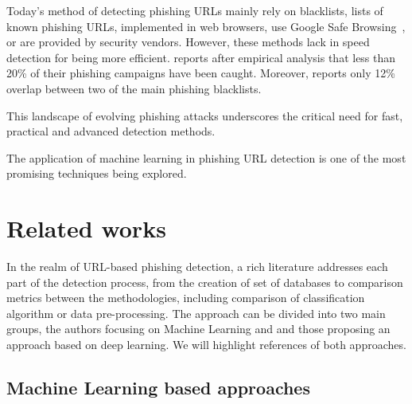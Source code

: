 \documentclass{article}
\begin{document}
    Today's method of detecting phishing URLs mainly rely on blacklists, lists of known phishing URLs, implemented in web browsers, use Google Safe Browsing~\cite{GoogleSafeBrowsing}, or are provided by security vendors.
    However, these methods lack in speed detection for being more efficient.
    \cite{PhishingExperimentalBlackLists2009} reports after empirical analysis that less than 20\% of their phishing campaigns have been caught.
    Moreover,\cite{PhishingBlackLists} reports only 12\% overlap between two of the main phishing blacklists.

    This landscape of evolving phishing attacks underscores the critical need for fast, practical and advanced detection methods.

    The application of machine learning in phishing URL detection is one of the most promising techniques being explored.


    \section{Related works}\label{sec:related-works}

    In the realm of URL-based phishing detection, a rich literature addresses each part of the detection process, from the creation of set of databases to comparison metrics between the methodologies, including comparison of classification algorithm or data pre-processing.
    The approach can be divided into two main groups, the authors focusing on Machine Learning and and those proposing an approach based on deep learning.
    We will highlight references of both approaches.

    \subsection{Machine Learning based approaches}\label{subsec:machine-learning-based-approaches}
\end{document}

